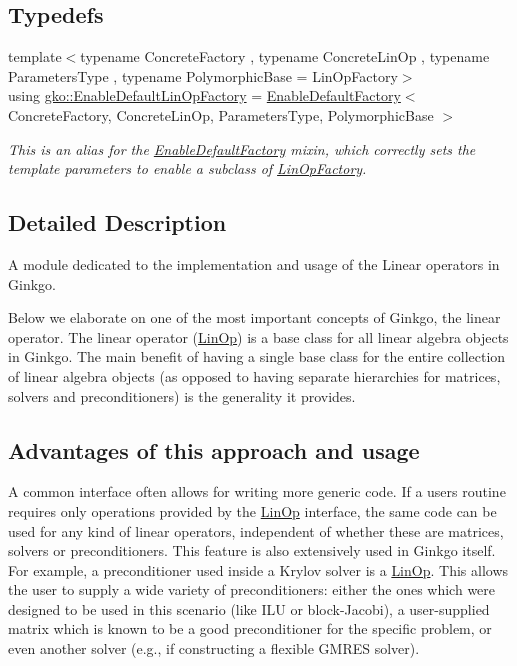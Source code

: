 \subsection*{Typedefs}
\begin{DoxyCompactItemize}
\item 
{\footnotesize template$<$typename Concrete\+Factory , typename Concrete\+Lin\+Op , typename Parameters\+Type , typename Polymorphic\+Base  = Lin\+Op\+Factory$>$ }\\using \hyperlink{group__LinOp_ga24628d477cba68b31cea690572c51912}{gko\+::\+Enable\+Default\+Lin\+Op\+Factory} = \hyperlink{classgko_1_1EnableDefaultFactory}{Enable\+Default\+Factory}$<$ Concrete\+Factory, Concrete\+Lin\+Op, Parameters\+Type, Polymorphic\+Base $>$
\begin{DoxyCompactList}\small\item\em This is an alias for the \hyperlink{classgko_1_1EnableDefaultFactory}{Enable\+Default\+Factory} mixin, which correctly sets the template parameters to enable a subclass of \hyperlink{classgko_1_1LinOpFactory}{Lin\+Op\+Factory}. \end{DoxyCompactList}\end{DoxyCompactItemize}


\subsection{Detailed Description}
A module dedicated to the implementation and usage of the Linear operators in Ginkgo. 

Below we elaborate on one of the most important concepts of Ginkgo, the linear operator. The linear operator (\hyperlink{classgko_1_1LinOp}{Lin\+Op}) is a base class for all linear algebra objects in Ginkgo. The main benefit of having a single base class for the entire collection of linear algebra objects (as opposed to having separate hierarchies for matrices, solvers and preconditioners) is the generality it provides.\hypertarget{group__LinOp_linop_3}{}\subsection{Advantages of this approach and usage}\label{group__LinOp_linop_3}
A common interface often allows for writing more generic code. If a user\textquotesingle{}s routine requires only operations provided by the \hyperlink{classgko_1_1LinOp}{Lin\+Op} interface, the same code can be used for any kind of linear operators, independent of whether these are matrices, solvers or preconditioners. This feature is also extensively used in Ginkgo itself. For example, a preconditioner used inside a Krylov solver is a \hyperlink{classgko_1_1LinOp}{Lin\+Op}. This allows the user to supply a wide variety of preconditioners\+: either the ones which were designed to be used in this scenario (like I\+LU or block-\/\+Jacobi), a user-\/supplied matrix which is known to be a good preconditioner for the specific problem, or even another solver (e.\+g., if constructing a flexible G\+M\+R\+ES solver).

